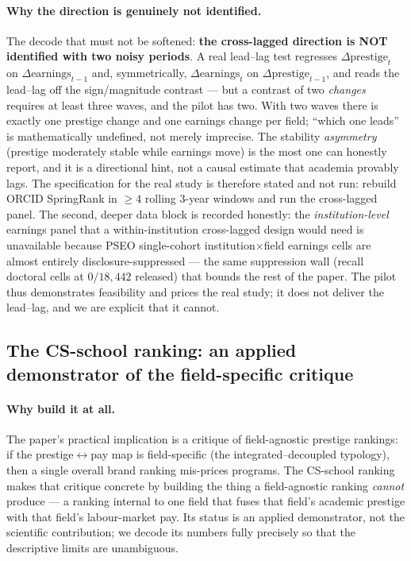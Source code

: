 \documentclass[11pt]{article}
\begin{document}
\paragraph{Why the direction is genuinely not identified.} The decode that must not be softened: \textbf{the cross-lagged direction is NOT identified with two noisy periods}. A real lead--lag test regresses $\Delta\text{prestige}_t$ on $\Delta\text{earnings}_{t-1}$ and, symmetrically, $\Delta\text{earnings}_t$ on $\Delta\text{prestige}_{t-1}$, and reads the lead--lag off the sign/magnitude contrast --- but a contrast of two \emph{changes} requires at least three waves, and the pilot has two. With two waves there is exactly one prestige change and one earnings change per field; ``which one leads'' is mathematically undefined, not merely imprecise. The stability \emph{asymmetry} (prestige moderately stable while earnings move) is the most one can honestly report, and it is a directional hint, not a causal estimate that academia provably lags. The specification for the real study is therefore stated and not run: rebuild ORCID SpringRank in $\ge4$ rolling 3-year windows and run the cross-lagged panel. The second, deeper data block is recorded honestly: the \emph{institution-level} earnings panel that a within-institution cross-lagged design would need is unavailable because PSEO single-cohort institution$\times$field earnings cells are almost entirely disclosure-suppressed --- the same suppression wall (recall doctoral cells at $0/18{,}442$ released) that bounds the rest of the paper. The pilot thus demonstrates feasibility and prices the real study; it does not deliver the lead--lag, and we are explicit that it cannot.

\subsection{The CS-school ranking: an applied demonstrator of the field-specific critique}\label{sec:csrank}

\paragraph{Why build it at all.} The paper's practical implication is a critique of field-agnostic prestige rankings: if the prestige$\leftrightarrow$pay map is field-specific (the integrated--decoupled typology), then a single overall brand ranking mis-prices programs. The CS-school ranking makes that critique concrete by building the thing a field-agnostic ranking \emph{cannot} produce --- a ranking internal to one field that fuses that field's academic prestige with that field's labour-market pay. Its status is an applied demonstrator, not the scientific contribution; we decode its numbers fully precisely so that the descriptive limits are unambiguous.
\end{document}
